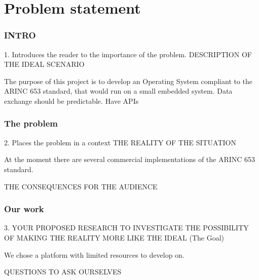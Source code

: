\chapter{Problem statement}

\subsection{INTRO}
1. Introduces the reader to the importance of the problem.
DESCRIPTION OF THE IDEAL SCENARIO

The purpose of this project is to develop an Operating System compliant to the ARINC 653 standard, that would run on a small embedded system.
Data exchange should be predictable.
Have APIs

\subsection{The problem}
2. Places the problem in a context
THE REALITY OF THE SITUATION

At the moment there are several commercial implementations of the ARINC 653 standard.

THE CONSEQUENCES FOR THE AUDIENCE

\subsection{Our work}
3.
YOUR PROPOSED RESEARCH TO INVESTIGATE THE POSSIBILITY OF MAKING THE REALITY MORE LIKE THE IDEAL
(The Goal)

We chose a platform with limited resources to develop on.

QUESTIONS TO ASK OURSELVES
